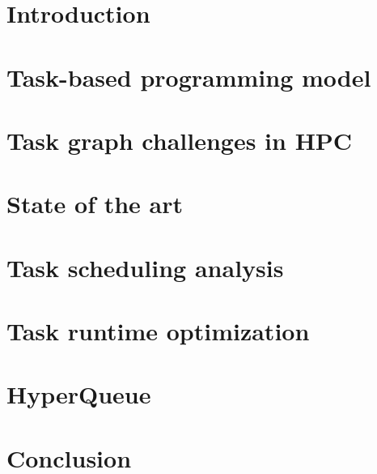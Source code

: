 \documentclass[english,phd]{diploma}
\begin{document}
\MakeTitlePages

\printglossaries

\listoffigures
\clearpage

\listoftables
\clearpage

\nocite{estee, rsds, ligate}

\chapter{Introduction}
\label{ch:Introduction}
%

\chapter{Task-based programming model}
\label{ch:taskgraphs}
%

\chapter{Task graph challenges in HPC}
\label{ch:challenges}


\chapter{State of the art}
\label{ch:sota}
%

\chapter{Task scheduling analysis}
\label{ch:estee}


\chapter{Task runtime optimization}
\label{ch:rsds}


\chapter{HyperQueue}
\label{ch:hyperqueue}
%

\chapter{Conclusion}
\label{ch:conclusion}
%
\end{document}

